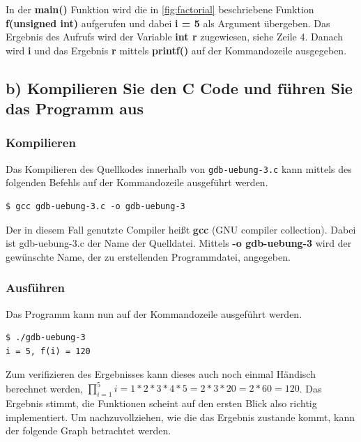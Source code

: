 \documentclass[12pt]{article}
\begin{document}
In der \textbf{main()} Funktion wird die in \ref{fig:factorial} beschriebene Funktion \textbf{f(unsigned int)} aufgerufen und dabei \textbf{i = 5} als Argument übergeben. Das Ergebnis des Aufrufs wird der Variable \textbf{int r} zugewiesen, siehe Zeile 4. Danach wird \textbf{i} und das Ergebnis \textbf{r} mittels \textbf{printf()} auf der Kommandozeile ausgegeben.

\subsection{b) Kompilieren Sie den C Code und führen Sie das Programm aus }
\subsubsection{Kompilieren}
Das Kompilieren des Quellkodes innerhalb von \texttt{gdb-uebung-3.c} kann mittels des folgenden Befehls auf der Kommandozeile ausgeführt werden.
\begin{lstlisting}
$ gcc gdb-uebung-3.c -o gdb-uebung-3
\end{lstlisting}
Der in diesem Fall genutzte Compiler heißt \textbf{gcc} (GNU compiler collection). Dabei ist gdb-uebung-3.c der Name der Quelldatei. Mittels \textbf{-o gdb-uebung-3} wird der gewünschte Name, der zu erstellenden Programmdatei, angegeben.

\subsubsection{Ausführen}
Das Programm kann nun auf der Kommandozeile ausgeführt werden.
\begin{lstlisting}
$ ./gdb-uebung-3                    
i = 5, f(i) = 120
\end{lstlisting}
Zum verifizieren des Ergebnisses kann dieses auch noch einmal Händisch berechnet werden, $ \prod_{i = 1}^{5} i = 1 * 2 * 3 * 4 * 5 = 2 * 3 * 20 = 2 * 60 = 120 $. Das Ergebnis stimmt, die Funktionen scheint auf den ersten Blick also richtig implementiert. Um nachzuvollziehen, wie die das Ergebnis zustande kommt, kann der folgende Graph betrachtet werden.
\end{document}
